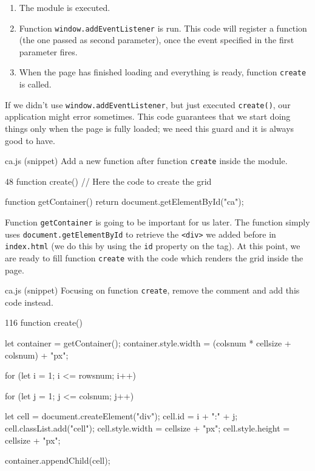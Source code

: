 \begin{enumerate}
\item The module is executed.
\item Function \texttt{window.addEventListener} is run. This code will register a function (the one
passed as second parameter), once the event specified in the first parameter fires.
\item When the page has finished loading and everything is ready, function \texttt{create} is called.
\end{enumerate}

If we didn't use \texttt{window.addEventListener}, but just executed \texttt{create()}, our
application might error sometimes. This code guarantees that we start doing things only when
the page is fully loaded; we need this guard and it is always good to have.

\begin{programcode}{ca.js (snippet)}
Add a new function after function \texttt{create} inside the module.
\begin{codeh1}{4}{8}
function create() {
  // Here the code to create the grid
}

function getContainer() {
  return document.getElementById("ca");
}
\end{codeh1}
\end{programcode}

Function \texttt{getContainer} is going to be important for us later. The function simply
uses \texttt{document.getElementById} to retrieve the \texttt{<div>} we added before in
\texttt{index.html} (we do this by using the \texttt{id} property on the tag).
At this point, we are ready to fill function
\texttt{create} with the code which renders the grid inside the page.

\begin{programcode}{ca.js (snippet)}
Focusing on function \texttt{create}, remove the comment and add this code instead.
\begin{codeh1}{1}{16}
function create() {
  let container = getContainer();
  container.style.width = (colsnum * cellsize + colsnum) + "px";

  for (let i = 1; i <= rowsnum; i++) {
    for (let j = 1; j <= colsnum; j++) {
      let cell = document.createElement("div");
      cell.id = i + ":" + j;
      cell.classList.add("cell");
      cell.style.width = cellsize + "px";
      cell.style.height = cellsize + "px";

      container.appendChild(cell);
    }
  }
}
\end{codeh1}
\end{programcode}

